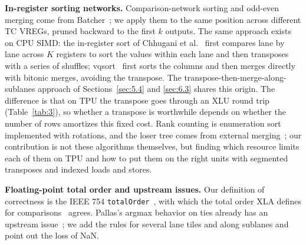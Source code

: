 \documentclass[sigconf,nonacm,balance=false]{acmart}
\newcommand{\code}[1]{\texttt{#1}}
\begin{document}
\textbf{In-register sorting networks.} Comparison-network sorting and odd-even merging come from Batcher~\cite{batcher1968}; we apply them to the same position across different TC VREGs, pruned backward to the first $k$ outputs. The same approach exists on CPU SIMD: the in-register sort of Chhugani et al.~\cite{chhugani2008} first compares lane by lane across $K$ registers to sort the values within each lane and then transposes with a series of shuffles; vqsort~\cite{wassenberg2022vqsort} first sorts the columns and then merges directly with bitonic merges, avoiding the transpose. The transpose-then-merge-along-sublanes approach of Sections~\ref{sec:5.4} and \ref{sec:6.3} shares this origin. The difference is that on TPU the transpose goes through an XLU round trip (Table~\ref{tab:3}), so whether a transpose is worthwhile depends on whether the number of rows amortizes this fixed cost. Rank counting is enumeration sort~\cite{knuth1998} implemented with rotations, and the loser tree comes from external merging~\cite{knuth1998}; our contribution is not these algorithms themselves, but finding which resource limits each of them on TPU and how to put them on the right units with segmented transposes and indexed loads and stores.

\textbf{Floating-point total order and upstream issues.} Our definition of correctness is the IEEE 754 \code{total\allowbreak{}Order}~\cite{ieee754}, with which the total order XLA defines for comparisons~\cite{xla-compare} agrees. Pallas's argmax behavior on ties already has an upstream issue~\cite{jax-issue-34620}; we add the rules for several lane tiles and along sublanes and point out the loss of NaN.
\end{document}
